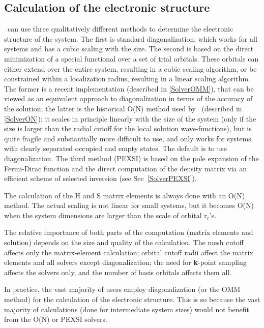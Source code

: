 \subsection{Calculation of the electronic structure}

\siesta\ can use three qualitatively different methods to determine
the electronic structure of the system. The first is standard
diagonalization, which works for all systems and has a cubic scaling
with the size. The second is based on
the direct minimization of a special functional over a set of
trial orbitals. These orbitals can either extend over the entire system,
resulting in a cubic scaling algorithm, or be constrained within a
localization radius, resulting in a linear scaling algorithm. The former
is a recent implementation (described in \ref{SolverOMM}), that can
be viewed as an equivalent approach to diagonalization in terms of the
accuracy of the solution; the latter is the historical O(N) method used by
\siesta\ (described in \ref{SolverON}); it scales in principle
linearly with the size of the system (only if the size is larger than
the radial cutoff for the local solution wave-functions), but is quite
fragile and substantially more difficult to use, and only works for
systems with clearly separated occupied and empty states. The default is
to use diagonalization. The third method (PEXSI) is based on the
pole expansion of the Fermi-Dirac function and the direct computation
of the density matrix via an efficient scheme of selected
inversion (see Sec~\ref{SolverPEXSI}).

The calculation of the H and S matrix elements is always done with an
O(N) method. The actual scaling is not linear for small systems, but
it becomes O(N) when the system dimensions are larger than the scale
of orbital r$_c$'s.

The relative importance of both parts of the computation (matrix
elements and solution) depends on the size and quality of the
calculation. The mesh cutoff affects only the matrix-element
calculation; orbital cutoff radii affect the matrix elements and all
solvers except diagonalization; the need for \textbf{k}-point sampling
affects the solvers only, and the number of basis orbitals affects
them all.

In practice, the vast majority of users employ diagonalization (or the
OMM method) for the calculation of the electronic structure. This is
so because the vast majority of calculations (done for intermediate
system sizes) would not benefit from the O(N) or PEXSI solvers.

